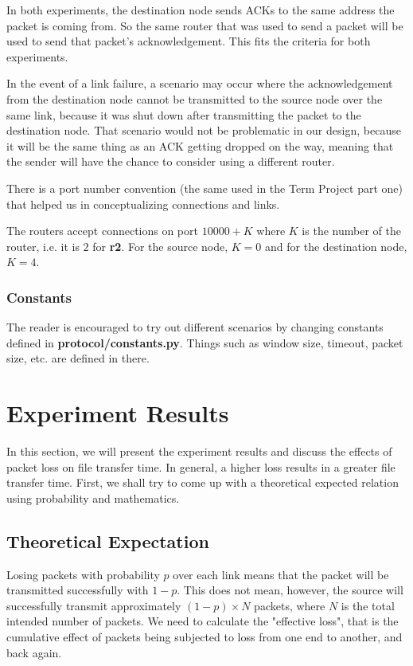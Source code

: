 \documentclass[conference]{IEEEtran}
\begin{document}
In both experiments, the destination node sends ACKs to the same address the packet is coming from. So
the same router that was used to send a packet will be used to send that packet's acknowledgement. This
fits the criteria for both experiments.

In the event of a link failure, a scenario may occur where the acknowledgement from the destination
node cannot be transmitted to the source node over the same link, because it was shut down after
transmitting the packet to the destination node. That scenario would not be problematic in our
design, because it will be the same thing as an ACK getting dropped on the way, meaning that the
sender will have the chance to consider using a different router.

There is a port number convention (the same used in the Term Project part one) that helped us in
conceptualizing connections and links.

The routers accept connections on port $10000 + K$ where $K$ is the number of the router, i.e.
it is $2$ for \textbf{r2}. For the source node, $K = 0$ and for the destination node, $K = 4$.

\subsubsection{Constants}

The reader is encouraged to try out different scenarios by changing constants defined in
\textbf{protocol/constants.py}. Things such as window size, timeout, packet size, etc. are
defined in there.

\section{Experiment Results}

In this section, we will present the experiment results and discuss the effects of packet loss
on file transfer time. In general, a higher loss results in a greater file transfer time. First,
we shall try to come up with a theoretical expected relation using probability and mathematics.

\subsection{Theoretical Expectation}

Losing packets with probability $p$ over each link means that the packet will be transmitted
successfully with $1 - p$. This does not mean, however, the source will successfully transmit
approximately $(1-p) \times N$ packets, where $N$ is the total intended number of packets. We
need to calculate the "effective loss", that is the cumulative effect of packets being subjected
to loss from one end to another, and back again.
\end{document}
